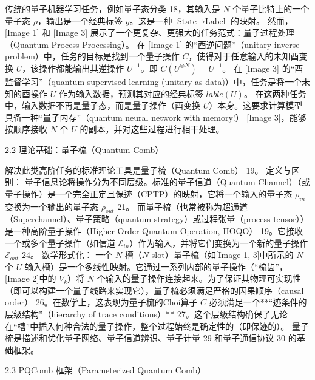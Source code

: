 \documentclass[12pt,a4paper]{article}
\begin{document}
传统的量子机器学习任务，例如量子态分类 18，其输入是 $N$ 个量子比特上的一个量子态 $\rho$，输出是一个经典标签 $y$。这是一种 $\text{State} \to \text{Label}$ 的映射。
然而，[Image 1] 和 [Image 3] 展示了一个更复杂、更强大的任务范式：量子过程处理（Quantum Process Processing）。
在 [Image 1] 的“酉逆问题”（unitary inverse problem）中，任务的目标是找到一个量子操作 $C$，使得对于任意输入的未知酉变换 $U$，该操作都能输出其逆操作 $U^{-1}$。即 $C(U^{\otimes N}) = U^{-1}$。
在 [Image 3] 的“酉监督学习”（quantum supervised learning (unitary as data)）中，任务是将一个未知的酉操作 $U$ 作为输入数据，预测其对应的经典标签 $lable(U)$。
在这两种任务中，输入数据不再是量子态，而是量子操作（酉变换 $U$）本身。这要求计算模型具备一种“量子内存”（quantum neural network with memory!） [Image 3]，能够按顺序接收 $N$ 个 $U$ 的副本，并对这些过程进行相干处理。

2.2 理论基础：量子梳（Quantum Comb）

解决此类高阶任务的标准理论工具是量子梳（Quantum Comb） 19。
定义与区别：
量子信息论将操作分为不同层级。标准的量子信道（Quantum Channel）（或量子操作）是一个完全正定且保迹（CPTP）的映射，它将一个输入的量子态 $\rho_{in}$ 变换为一个输出的量子态 $\rho_{out}$ 21。
而量子梳（也常被称为超通道（Superchannel）、量子策略（quantum strategy）或过程张量（process tensor））是一种高阶量子操作（Higher-Order Quantum Operation, HOQO） 19。它接收一个或多个量子操作（如信道 $\mathcal{E}_{in}$）作为输入，并将它们变换为一个新的量子操作 $\mathcal{E}_{out}$ 24。
数学形式化：
一个 $N$-槽（$N$-slot）量子梳（如[Image 1, 3]中所示的 $N$ 个 $U$ 输入槽）是一个多线性映射。它通过一系列内部的量子操作（“梳齿”，[Image 2]中的 $V_k$）将 $N$ 个输入的量子操作连接起来。为了保证其物理可实现性（即可以构建一个量子线路来实现它），量子梳必须满足严格的因果顺序（causal order） 26。在数学上，这表现为量子梳的Choi算子 $C$ 必须满足一个**“迹条件的层级结构”（hierarchy of trace conditions）** 27。这个层级结构确保了无论在“槽”中插入何种合法的量子操作，整个过程始终是确定性的（即保迹的）。
量子梳是描述和优化量子网络、量子信道辨识、量子计量 29 和量子通信协议 30 的基础框架。

2.3 PQComb 框架（Parameterized Quantum Comb）
\end{document}
